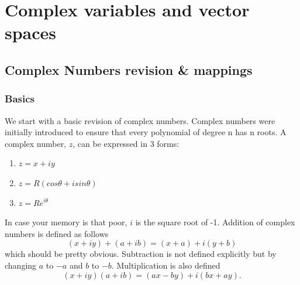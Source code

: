 \chapter{Complex variables and vector spaces}
\minitoc
\pagebreak
\section{Complex Numbers revision \& mappings}
\subsection{Basics}
We start with a basic revision of complex numbers.
 Complex numbers were initially introduced to ensure that every polynomial of degree n has n roots. 
 A complex number, $z$, can be expressed in 3 forms:
%
\begin{enumerate}
	\item $z=x+iy$
	\item $z=R(cos\theta+isin\theta)$
	\item $z=Re^{i\theta}$
\end{enumerate}
%
In case your memory is that poor, $i$ is the square root of -1.
 Addition of complex numbers is defined as follows $$(x+iy) + (a+ib) = (x+a) + i(y+b) $$
which should be pretty obvious.
 Subtraction is not defined explicitly but by changing $a$ to $-a$ and $b$ to $-b$.
  Multiplication is also defined $$(x+iy)(a+ib) = (ax-by)+i(bx+ay).$$
%
